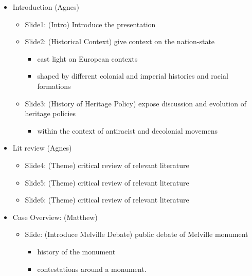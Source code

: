\documentclass{scrartcl}
\begin{document}
\begin{itemize}
    \item Introduction (Agnes)
    \begin{itemize}
        \item Slide1: (Intro) Introduce the presentation    
        \item Slide2: (Historical Context) give context on the nation-state    
        \begin{itemize}
            \item cast light on European contexts 
            \item shaped by different colonial and imperial histories and racial formations
        \end{itemize}        
        \item Slide3: (History of Heritage Policy) expose discussion and evolution of heritage policies        
        \begin{itemize}
            \item within the context of antiracist and decolonial movemens
        \end{itemize}
    \end{itemize}
    \item Lit review (Agnes)
    \begin{itemize}
        \item Slide4: (Theme) critical review of relevant literature
    \end{itemize}
    \begin{itemize}
        \item Slide5: (Theme) critical review of relevant literature
    \end{itemize}
    \begin{itemize}
        \item Slide6: (Theme) critical review of relevant literature
    \end{itemize}
    \item Case Overview:  (Matthew)
    \begin{itemize}
        \item Slide: (Introduce Melville Debate) public debate of Melville monument 
        \begin{itemize}
            \item history of the monument
            \item contestations around a monument.
        \end{itemize}
    \end{itemize}
    \begin{itemize}

\end{itemize}
\end{itemize}
\end{document}
